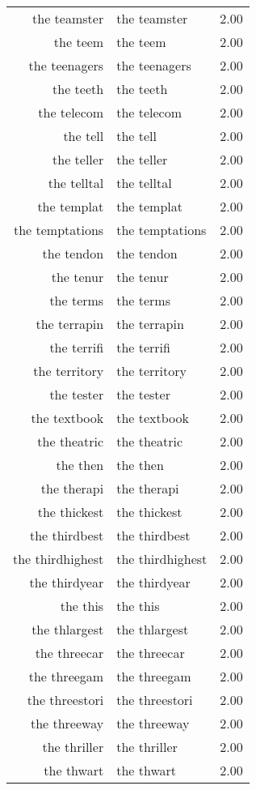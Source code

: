 \begin{table}[ht]
\begin{tabular}{rlr}
  the teamster & the teamster & 2.00 \\ 
  the teem & the teem & 2.00 \\ 
  the teenagers & the teenagers & 2.00 \\ 
  the teeth & the teeth & 2.00 \\ 
  the telecom & the telecom & 2.00 \\ 
  the tell & the tell & 2.00 \\ 
  the teller & the teller & 2.00 \\ 
  the telltal & the telltal & 2.00 \\ 
  the templat & the templat & 2.00 \\ 
  the temptations & the temptations & 2.00 \\ 
  the tendon & the tendon & 2.00 \\ 
  the tenur & the tenur & 2.00 \\ 
  the terms & the terms & 2.00 \\ 
  the terrapin & the terrapin & 2.00 \\ 
  the terrifi & the terrifi & 2.00 \\ 
  the territory & the territory & 2.00 \\ 
  the tester & the tester & 2.00 \\ 
  the textbook & the textbook & 2.00 \\ 
  the theatric & the theatric & 2.00 \\ 
  the then & the then & 2.00 \\ 
  the therapi & the therapi & 2.00 \\ 
  the thickest & the thickest & 2.00 \\ 
  the thirdbest & the thirdbest & 2.00 \\ 
  the thirdhighest & the thirdhighest & 2.00 \\ 
  the thirdyear & the thirdyear & 2.00 \\ 
  the this & the this & 2.00 \\ 
  the thlargest & the thlargest & 2.00 \\ 
  the threecar & the threecar & 2.00 \\ 
  the threegam & the threegam & 2.00 \\ 
  the threestori & the threestori & 2.00 \\ 
  the threeway & the threeway & 2.00 \\ 
  the thriller & the thriller & 2.00 \\ 
  the thwart & the thwart & 2.00 \\ 

\end{tabular}
\end{table}
